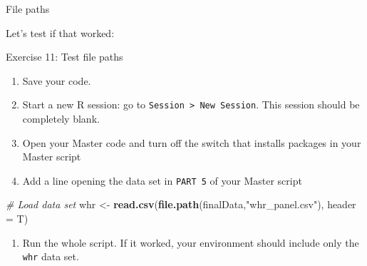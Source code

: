 \documentclass[ignorenonframetext,]{beamer}
\newenvironment{Shaded}{\begin{snugshade}}{\end{snugshade}}
\newcommand{\KeywordTok}[1]{\textcolor[rgb]{0.13,0.29,0.53}{\textbf{#1}}}
\newcommand{\DataTypeTok}[1]{\textcolor[rgb]{0.13,0.29,0.53}{#1}}
\newcommand{\StringTok}[1]{\textcolor[rgb]{0.31,0.60,0.02}{#1}}
\newcommand{\CommentTok}[1]{\textcolor[rgb]{0.56,0.35,0.01}{\textit{#1}}}
\newcommand{\NormalTok}[1]{#1}
\providecommand{\tightlist}{%
  \setlength{\itemsep}{0pt}\setlength{\parskip}{0pt}}
\begin{document}
\begin{frame}[fragile]{File paths}

Let's test if that worked:

\begin{block}{Exercise 11: Test file paths}

\begin{enumerate}
\def\labelenumi{\arabic{enumi}.}
\item
  Save your code.
\item
  Start a new R session: go to
  \texttt{Session\ \textgreater{}\ New\ Session}. This session should be
  completely blank.
\item
  Open your Master code and turn off the switch that installs packages
  in your Master script
\item
  Add a line opening the data set in \texttt{PART\ 5} of your Master
  script
\end{enumerate}

\begin{Shaded}
\begin{Highlighting}[]
\CommentTok{# Load data set}
\NormalTok{whr <-}\StringTok{ }\KeywordTok{read.csv}\NormalTok{(}\KeywordTok{file.path}\NormalTok{(finalData,}\StringTok{"whr_panel.csv"}\NormalTok{),}
                \DataTypeTok{header =}\NormalTok{ T)}
\end{Highlighting}
\end{Shaded}

\begin{enumerate}
\def\labelenumi{\arabic{enumi}.}
\setcounter{enumi}{4}
\tightlist
\item
  Run the whole script. If it worked, your environment should include
  only the \texttt{whr} data set.
\end{enumerate}

\end{block}

\end{frame}
\end{document}
